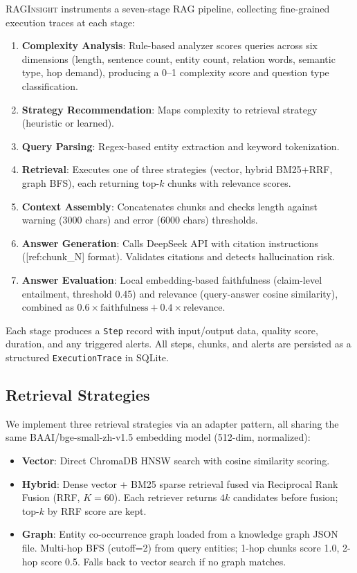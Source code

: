 \documentclass[11pt,a4paper]{article}
\begin{document}
\textsc{RAGInsight} instruments a seven-stage RAG pipeline, collecting fine-grained execution traces at each stage:

\begin{enumerate}[leftmargin=*,itemsep=1pt]
\item \textbf{Complexity Analysis}: Rule-based analyzer scores queries across six dimensions (length, sentence count, entity count, relation words, semantic type, hop demand), producing a 0--1 complexity score and question type classification.
\item \textbf{Strategy Recommendation}: Maps complexity to retrieval strategy (heuristic or learned).
\item \textbf{Query Parsing}: Regex-based entity extraction and keyword tokenization.
\item \textbf{Retrieval}: Executes one of three strategies (vector, hybrid BM25+RRF, graph BFS), each returning top-$k$ chunks with relevance scores.
\item \textbf{Context Assembly}: Concatenates chunks and checks length against warning (3000 chars) and error (6000 chars) thresholds.
\item \textbf{Answer Generation}: Calls DeepSeek API with citation instructions ([ref:chunk\_N] format). Validates citations and detects hallucination risk.
\item \textbf{Answer Evaluation}: Local embedding-based faithfulness (claim-level entailment, threshold 0.45) and relevance (query-answer cosine similarity), combined as $0.6 \times \text{faithfulness} + 0.4 \times \text{relevance}$.
\end{enumerate}

Each stage produces a \texttt{Step} record with input/output data, quality score, duration, and any triggered alerts. All steps, chunks, and alerts are persisted as a structured \texttt{ExecutionTrace} in SQLite.

\subsection{Retrieval Strategies}

We implement three retrieval strategies via an adapter pattern, all sharing the same BAAI/bge-small-zh-v1.5 embedding model (512-dim, normalized):

\begin{itemize}[leftmargin=*,itemsep=1pt]
\item \textbf{Vector}: Direct ChromaDB HNSW search with cosine similarity scoring.
\item \textbf{Hybrid}: Dense vector + BM25 sparse retrieval fused via Reciprocal Rank Fusion (RRF, $K=60$). Each retriever returns $4k$ candidates before fusion; top-$k$ by RRF score are kept.
\item \textbf{Graph}: Entity co-occurrence graph loaded from a knowledge graph JSON file. Multi-hop BFS (cutoff=2) from query entities; 1-hop chunks score 1.0, 2-hop score 0.5. Falls back to vector search if no graph matches.
\end{itemize}
\end{document}
